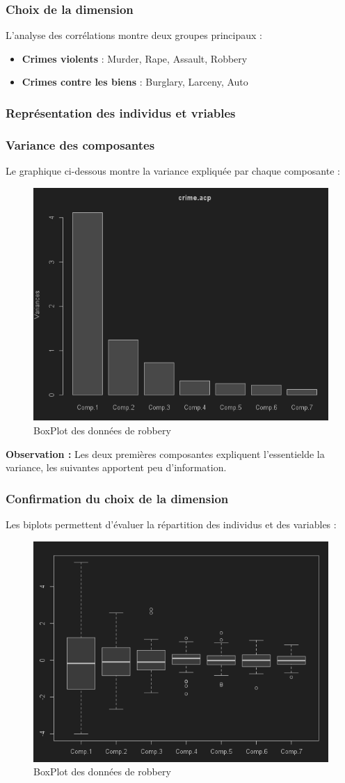 \documentclass{article}
\begin{document}
    \subsubsection{Choix de la dimension}

    L’analyse des corrélations montre deux groupes principaux :
    \begin{itemize}
        \item \textbf{Crimes violents} : Murder, Rape, Assault, Robbery
        \item \textbf{Crimes contre les biens} : Burglary, Larceny, Auto
    \end{itemize}

    \subsubsection{Représentation des individus et vriables}

    \subsubsection{Variance des composantes}
    Le graphique ci-dessous montre la variance expliquée par chaque composante :
    \begin{figure}[H]
        \centering
        \includegraphics[width=0.5\linewidth]{img/plotcrimacp}
        \caption{BoxPlot des données de robbery}
    \end{figure}

    \textbf{Observation :} Les deux premières composantes expliquent l’essentielde la variance, les suivantes apportent peu d’information.

    \subsubsection{Confirmation du choix de la dimension}
    Les biplots permettent d’évaluer la répartition des individus et des variables :
    \begin{figure}[H]
        \centering
        \includegraphics[width=0.5\linewidth]{img/bowplotcrimeacpscore}
        \caption{BoxPlot des données de robbery}
    \end{figure}
\end{document}

